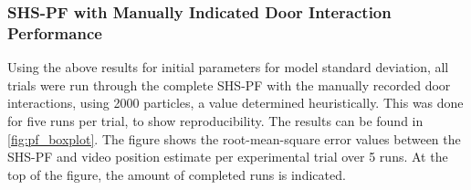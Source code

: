 %
%

\subsubsection{SHS-PF with Manually Indicated Door Interaction Performance}
Using the above results for initial parameters for model standard deviation, all trials were run through the complete SHS-PF with the manually recorded door interactions, using 2000 particles, a value determined heuristically. This was done for five runs per trial, to show reproducibility. The results can be found in \cref{fig:pf_boxplot}. The figure shows the root-mean-square error values between the SHS-PF and video position estimate per experimental trial over 5 runs. At the top of the figure, the amount of completed runs is indicated.

